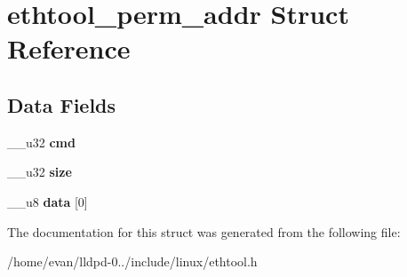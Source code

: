 \section{ethtool\-\_\-perm\-\_\-addr \-Struct \-Reference}
\label{structethtool__perm__addr}
\subsection*{\-Data \-Fields}
\begin{DoxyCompactItemize}
\item 
\-\_\-\-\_\-u32 {\bfseries cmd}\label{structethtool__perm__addr_a66d231264d5aa36fd7d347e2c967769a}

\item 
\-\_\-\-\_\-u32 {\bfseries size}\label{structethtool__perm__addr_a3b4e953e2801c3a815e11035b1a97c85}

\item 
\-\_\-\-\_\-u8 {\bfseries data} [0]\label{structethtool__perm__addr_a1bfe8b027f6e5624818c1a92b91bf6d2}

\end{DoxyCompactItemize}


\-The documentation for this struct was generated from the following file\-:\begin{DoxyCompactItemize}
\item 
/home/evan/lldpd-\/0../include/linux/ethtool.\-h\end{DoxyCompactItemize}
